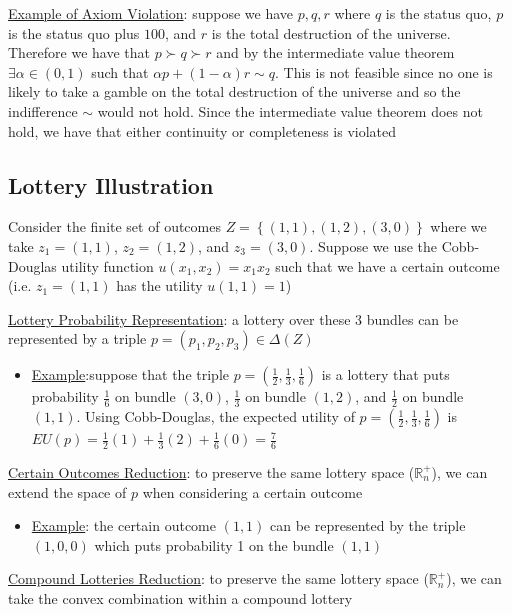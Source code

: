 \documentclass{article}
\begin{document}
  \par
  \underline{Example of Axiom Violation}: suppose we have $p, q, r$ where $q$ is the status quo, $p$ is the status quo plus $100$, and $r$ is the total destruction of the universe. Therefore we have that $p \succ q \succ r$ and by the intermediate value theorem $\exists \alpha \in (0,1)$ such that $\alpha p + (1- \alpha)r \sim q$. This is not feasible since no one is likely to take a gamble on the total destruction of the universe and so the indifference $\sim$ would not hold. Since the intermediate value theorem does not hold, we have that either continuity or completeness is violated
\vspace{6mm}
\subsection{Lottery Illustration}
Consider the finite set of outcomes $Z = \left\{ (1,1), (1,2), (3,0) \right\}$ where we take $z_{1} = (1,1)$, $z_{2} = (1,2)$, and $z_{3} = (3,0)$. Suppose we use the Cobb-Douglas utility function $u(x_{1}, x_{2}) = x_{1}x_{2}$ such that we have a certain outcome (i.e. $z_{1} = (1,1)$ has the utility $u(1,1) = 1$) \par \vspace{6mm}
  \underline{Lottery Probability Representation}: a lottery over these 3 bundles can be represented by a triple $p = (p_{1}, p_{2}, p_{3}) \in \Delta (Z)$
  \begin{itemize}
    \item  \underline{Example}:suppose that the triple $p = (\tfrac{1}{2}, \tfrac{1}{3}, \tfrac{1}{6})$ is a lottery that puts probability $\tfrac{1}{6}$ on bundle $(3,0)$, $\tfrac{1}{3}$ on bundle $(1,2)$, and $\frac{1}{2}$ on bundle $(1,1)$. Using Cobb-Douglas, the expected utility of $p = (\tfrac{1}{2}, \tfrac{1}{3}, \tfrac{1}{6})$ is $EU(p) = \tfrac{1}{2}(1) + \tfrac{1}{3}(2) + \tfrac{1}{6}(0) = \tfrac{7}{6}$
  \end{itemize}
  \par
  \underline{Certain Outcomes Reduction}: to preserve the same lottery space ($\mathbb{R}^{+}_{n}$), we can extend the space of $p$ when considering a certain outcome
  \begin{itemize}
    \item  \underline{Example}: the certain outcome $(1,1)$ can be represented by the triple $(1,0,0)$ which puts probability 1 on the bundle $(1,1)$
  \end{itemize}
  \par
  \underline{Compound Lotteries Reduction}: to preserve the same lottery space ($\mathbb{R}^{+}_{n}$), we can take the convex combination within a compound lottery
\end{document}
